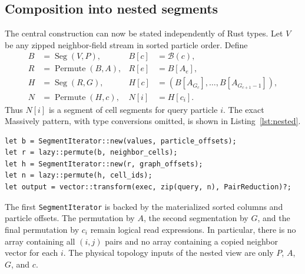 \documentclass[a4paper,10pt]{article}
\newcommand{\code}[1]{\texttt{#1}}
\newcommand{\Seg}{\operatorname{Seg}}
\newcommand{\Perm}{\operatorname{Permute}}
\begin{document}
\subsection{Composition into nested segments}

The central construction can now be stated independently of Rust types.  Let
$V$ be any zipped neighbor-field stream in sorted particle order.  Define
\begin{align}
 B &= \Seg(V,P),
   & B[c] &= \mathcal{B}(c),\\
 R &= \Perm(B,A),
   & R[e] &= B[A_e],\\
 H &= \Seg(R,G),
   & H[c] &= (B[A_{G_c}],\ldots,B[A_{G_{c+1}-1}]),\\
 N &= \Perm(H,c),
   & N[i] &= H[c_i].
 \label{eq:nested}
\end{align}
Thus $N[i]$ is a segment of cell segments for query particle $i$.  The exact
Massively pattern, with type conversions omitted, is shown in
Listing~\ref{lst:nested}.

\begin{lstlisting}[caption={Schematic Massively construction of one SPH neighborhood view.},label={lst:nested}]
let b = SegmentIterator::new(values, particle_offsets);
let r = lazy::permute(b, neighbor_cells);
let h = SegmentIterator::new(r, graph_offsets);
let n = lazy::permute(h, cell_ids);
let output = vector::transform(exec, zip(query, n), PairReduction)?;
\end{lstlisting}

The first \code{SegmentIterator} is backed by the materialized sorted columns and
particle offsets.  The permutation by $A$, the second segmentation by $G$, and
the final permutation by $c_i$ remain logical read expressions.  In particular,
there is no array containing all $(i,j)$ pairs and no array containing a copied
neighbor vector for each $i$.  The physical topology inputs of the nested view
are only $P$, $A$, $G$, and $c$.
\end{document}
